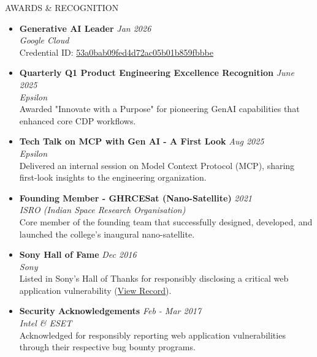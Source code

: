 \documentclass{resume} %
\begin{document}
\begin{rSection}{AWARDS \& RECOGNITION} 

\begin{itemize}
    \itemsep -3pt {} 
    
    \item \textbf{Generative AI Leader} \hfill \textit{Jan 2026} \\
    \textit{Google Cloud} \\
    Credential ID: \href{https://www.credly.com/badges/3b94641d-b323-4f5b-b511-b36f286d6a5d}{53a0bab09fed4d72ac05b01b859fbbbe}

    \item \textbf{Quarterly Q1 Product Engineering Excellence Recognition} \hfill \textit{June 2025} \\
    \textit{Epsilon} \\
    Awarded "Innovate with a Purpose" for pioneering GenAI capabilities that enhanced core CDP workflows.

    \item \textbf{Tech Talk on MCP with Gen AI - A First Look} \hfill \textit{Aug 2025} \\
    \textit{Epsilon} \\
    Delivered an internal session on Model Context Protocol (MCP), sharing first-look insights to the engineering organization.

    \item \textbf{Founding Member - GHRCESat (Nano-Satellite)} \hfill \textit{2021} \\
    \textit{ISRO (Indian Space Research Organisation)} \\
    Core member of the founding team that successfully designed, developed, and launched the college’s inaugural nano-satellite.

    \item \textbf{Sony Hall of Fame} \hfill \textit{Dec 2016} \\
    \textit{Sony} \\
    Listed in Sony's Hall of Thanks for responsibly disclosing a critical web application vulnerability (\href{https://secure.sony.net/hallofthanks}{View Record}).

    \item \textbf{Security Acknowledgements} \hfill \textit{Feb - Mar 2017} \\
    \textit{Intel \& ESET} \\
    Acknowledged for responsibly reporting web application vulnerabilities through their respective bug bounty programs.

\end{itemize}

\end{rSection}
\end{document}

